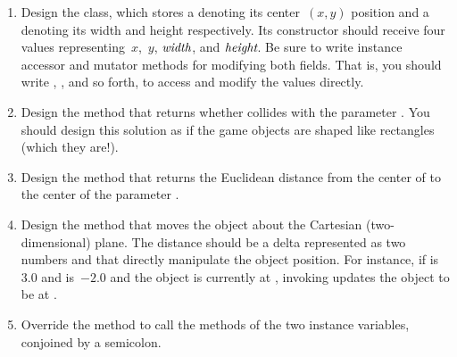 \begin{enumerate}[label=(\alph*)]
    \item Design the  class, which stores a  denoting its center~$(x, y)$ position and a  denoting its width and height respectively. Its constructor should receive four  values representing~$x$,~$y$, $\emph{width}$, and $\emph{height}$. Be sure to write instance accessor and mutator methods for modifying both fields. That is, you should write , , and so forth, to access and modify the  values directly. 

    \item Design the  method that returns whether   collides with the parameter . You should design this solution as if the game objects are shaped like rectangles (which they are!).

    \item Design the  method that returns the Euclidean distance from the center of   to the center of the parameter . 

    \item Design the  method that moves the object about the Cartesian (two-dimensional) plane. The distance should be a delta represented as two  numbers  and  that directly manipulate the object position. For instance, if  is~$3.0$ and  is~$-2.0$ and the object is currently at , invoking  updates the object to be at .

    \item Override the  method to call the  methods of the two instance variables, conjoined by a semicolon.
\end{enumerate}

